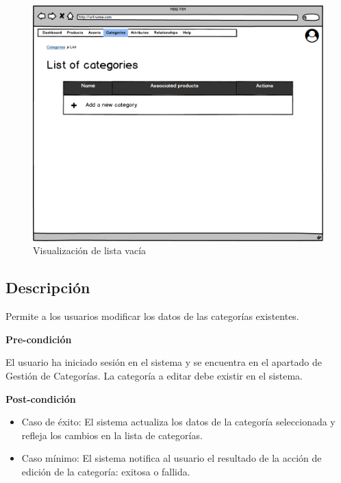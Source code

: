 \begin{figure}[H]
    \includegraphics[width=1\linewidth]{mockups/RF4.2_2.png}
    \caption{Visualización de lista vacía}
   \end{figure}
\vspace{1.0cm}


\subsection*{Descripción}
Permite a los usuarios modificar los datos de las categorías existentes.\par
\vspace{0.15cm}

\textbf{Pre-condición}\par
El usuario ha iniciado sesión en el sistema y se encuentra en el apartado de Gestión de Categorías. La categoría a editar debe existir en el sistema. \par
\vspace{0.15cm}

\textbf{Post-condición}
\begin{itemize}
    \item Caso de éxito: El sistema actualiza los datos de la categoría seleccionada y refleja los cambios en la lista de categorías.
    \item Caso mínimo: El sistema notifica al usuario el resultado de la acción de edición de la categoría: exitosa o fallida.
\end{itemize}

